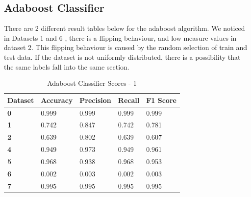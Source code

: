 \documentclass[submission,copyright,creativecommons]{eptcs}
\begin{document}
\subsection{Adaboost Classifier}
There are 2 different result tables below for the adaboost algorithm. We noticed in Datasets 1 and 6 , there is a flipping behaviour, and low measure values in dataset 2. This flipping behaviour is caused by the random selection of train and test data. If the dataset is not uniformly distributed, there is a possibility that the same labels fall into the same section.
\begin{table}[H]
\begin{center}
\begin{tabular}{|l|l|l|l|l|}
\hline
\textbf{Dataset}  & \textbf{Accuracy} & \textbf{Precision} & \textbf{Recall} & \textbf{F1 Score} \\ \hline
\textbf{0} & 0.999             & 0.999              & 0.999           & 0.999             \\ \hline
\textbf{1} & 0.742             & 0.847              & 0.742           & 0.781             \\ \hline
\textbf{2} & 0.639             & 0.802              & 0.639           & 0.607             \\ \hline
\textbf{4} & 0.949             & 0.973              & 0.949           & 0.961             \\ \hline
\textbf{5} & 0.968             & 0.938              & 0.968           & 0.953             \\ \hline
\textbf{6} & 0.002             & 0.003              & 0.002           & 0.003             \\ \hline
\textbf{7} & 0.995             & 0.995              & 0.995           & 0.995             \\ \hline
\end{tabular}
\caption{Adaboost Classifier Scores - 1}
\label{tab:my-table}
\end{center}
\end{table}
\end{document}
